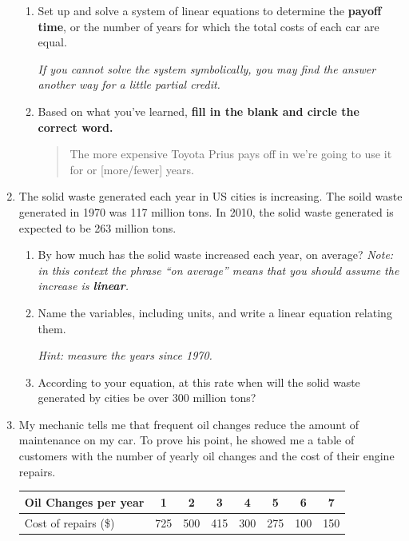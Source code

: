 \documentclass[12pt]{article}
\begin{document}
\begin{enumerate}
\begin{enumerate}
\item Set up and solve a system of linear equations to determine the \textbf{payoff time}, or the number of years for which the total costs of each car are equal.

\emph{If you cannot solve the system symbolically, you may find the answer another way for a little partial credit.}
\vfill

\item Based on what you've learned, \textbf{fill in the blank and circle the correct word.}

\begin{quote}
The more expensive Toyota Prius pays off in we're going to use it for \hrulefill   or [more/fewer] years.  
\end{quote}

\end{enumerate}
\newpage



\item The solid waste generated each year in US cities is increasing.  The soild waste generated in 1970 was 117 million tons. In 2010, the solid waste generated is expected to be 263 million tons.  

\begin{enumerate}
\item By how much has the solid waste increased each year, on average?  \emph{Note:  in this context the phrase ``on average'' means that you should assume the increase is \textbf{linear}.}
\vfill
\item Name the variables, including units, and write a linear equation relating them.

\emph{Hint:  measure the years since 1970.}
\vfill
\item According to your equation, at this rate when will the solid waste generated by cities be over 300 million tons?
\vfill
\end{enumerate}

\newpage %


\item My mechanic tells me that frequent oil changes reduce the amount of maintenance on my car.  To prove his point, he showed me a table of customers with the number of yearly oil changes and the cost of their engine repairs.

\begin{center}
\begin{tabular} {|l|c|c |c|c|c|c|c|}  \hline
Oil Changes per year & 1 & 2 & 3 & 4 & 5 & 6 & 7  \\ \hline
Cost of repairs (\$) & 725 & 500 & 415 & 300 & 275 & 100 & 150  \\ \hline
\end{tabular}
\end{center}


\end{enumerate}
\end{document}
